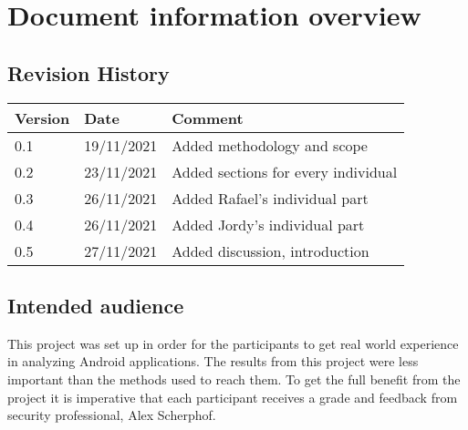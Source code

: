 \section*{Document information overview}
\subsection*{Revision History}

\begin{tabularx}{\textwidth}{|l|l|X|}
  \hline
  \textbf{Version} & \textbf{Date} & \textbf{Comment}                  \\ \hline
  0.1              & 19/11/2021    & Added methodology and scope       \\ \hline
  0.2              & 23/11/2021    & Added sections for every individual \\ \hline
  0.3              & 26/11/2021    & Added Rafael's individual part      \\ \hline
  0.4              & 26/11/2021    & Added Jordy's individual part      \\ \hline
  0.5              & 27/11/2021    & Added discussion, introduction      \\ \hline
\end{tabularx}

\subsection*{Intended audience}

This project was set up in order for the participants to get real world experience in analyzing Android applications.
The results from this project were less important than the methods used to reach them.
To get the full benefit from the project it is imperative that each participant receives a grade and feedback from security professional, Alex Scherphof.

\newpage
